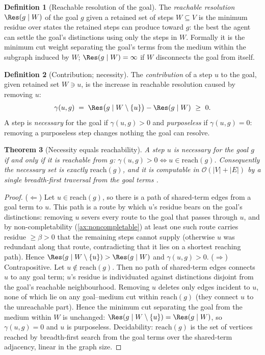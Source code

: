 \documentclass[11pt,a4paper]{article}
\theoremstyle{thmstyle}
\newtheorem{theorem}{Theorem}[section]
\theoremstyle{definition}
\newtheorem{definition}[theorem]{Definition}
\theoremstyle{remark}
\newcommand{\Vrt}{V}
\newcommand{\Edg}{E}
\newcommand{\flo}{\beta}                %
\newcommand{\goal}{g}                   %
\newcommand{\reach}{\mathrm{reach}}
\newcommand{\contrib}{\gamma}           %
\newcommand{\abs}[1]{\lvert#1\rvert}
\newcommand{\set}[1]{\{#1\}}
\begin{document}
\begin{definition}[Reachable resolution of the goal]
\label{def:resolution}
The \emph{reachable resolution} $\Res(\goal\mid W)$ of the goal $\goal$ given a
retained set of steps $W\subseteq\Vrt$ is the minimum residue over states the
retained steps can produce toward $\goal$: the best the agent can settle the
goal's distinctions using only the steps in $W$. Formally it is the minimum cut
weight separating the goal's terms from the medium within the subgraph induced
by $W$; $\Res(\goal\mid W)=\infty$ if $W$ disconnects the goal from itself.
\end{definition}

\begin{definition}[Contribution; necessity]
\label{def:contribution}
The \emph{contribution} of a step $u$ to the goal, given retained set $W\ni u$,
is the increase in reachable resolution caused by removing $u$:
\[
\contrib(u,\goal)\;=\;\Res\bigl(\goal\mid W\setminus\set u\bigr)-\Res(\goal\mid W)\ \ge\ 0.
\]
A step is \emph{necessary} for the goal if $\contrib(u,\goal)>0$ and
\emph{purposeless} if $\contrib(u,\goal)=0$: removing a purposeless step changes
nothing the goal can resolve.
\end{definition}

\begin{theorem}[Necessity equals reachability]
\label{thm:necessity}
A step $u$ is necessary for the goal $\goal$ if and only if it is reachable from
$\goal$: $\contrib(u,\goal)>0 \iff u\in\reach(\goal)$. Consequently the necessary
set is exactly $\reach(\goal)$, and it is computable in
$\mathcal{O}(\abs\Vrt+\abs\Edg)$ by a single breadth-first traversal from the
goal terms \citep{tarjan1972,diestel2017}.
\end{theorem}

\begin{proof}
($\Leftarrow$) Let $u\in\reach(\goal)$, so there is a path of shared-term edges
from a goal term to $u$. This path is a route by which $u$'s residue bears on the
goal's distinctions: removing $u$ severs every route to the goal that passes
through $u$, and by non-completability (\cref{ax:noncompletable}) at least one
such route carries residue $\ge\flo>0$ that the remaining steps cannot supply
(otherwise $u$ was redundant along that route, contradicting that it lies on a
shortest reaching path). Hence $\Res(\goal\mid W\setminus\set u)>\Res(\goal\mid W)$
and $\contrib(u,\goal)>0$.
($\Rightarrow$) Contrapositive. Let $u\notin\reach(\goal)$. Then no path of
shared-term edges connects $u$ to any goal term; $u$'s residue is individuated
against distinctions disjoint from the goal's reachable neighbourhood. Removing
$u$ deletes only edges incident to $u$, none of which lie on any goal--medium
cut within $\reach(\goal)$ (they connect $u$ to the unreachable part). Hence the
minimum cut separating the goal from the medium within $W$ is unchanged:
$\Res(\goal\mid W\setminus\set u)=\Res(\goal\mid W)$, so $\contrib(u,\goal)=0$ and
$u$ is purposeless. Decidability: $\reach(\goal)$ is the set of vertices reached
by breadth-first search from the goal terms over the shared-term adjacency,
linear in the graph size.
\end{proof}
\end{document}
